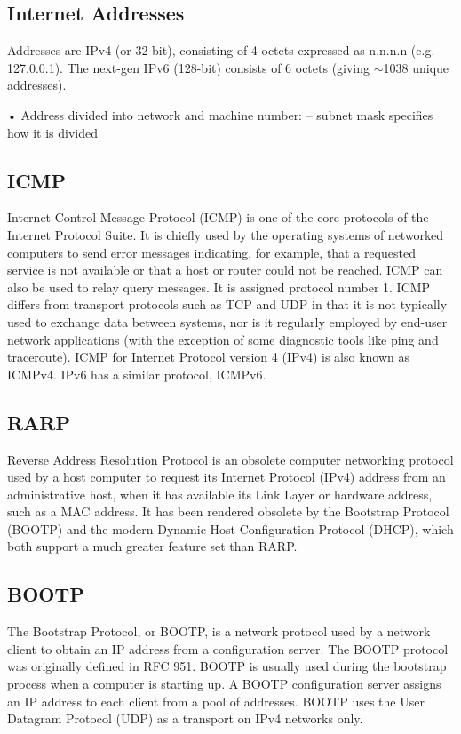 \documentclass[a4paper,oneside]{report}
\begin{document}
    	\subsection{Internet Addresses}
    	Addresses are IPv4 (or 32-bit), consisting of 4 octets expressed as n.n.n.n (e.g. 127.0.0.1). The next-gen IPv6 (128-bit) consists of 6 octets (giving $\sim$1038 unique addresses).

• Address divided into network and machine number:
– subnet mask specifies how it is divided
    	
    	\subsection{ICMP}
	Internet Control Message Protocol (ICMP) is one of the core protocols of the Internet Protocol Suite. It is chiefly used by the operating systems of networked computers to send error messages indicating, for example, that a requested service is not available or that a host or router could not be reached. ICMP can also be used to relay query messages. It is assigned protocol number 1. ICMP differs from transport protocols such as TCP and UDP in that it is not typically used to exchange data between systems, nor is it regularly employed by end-user network applications (with the exception of some diagnostic tools like ping and traceroute).
	ICMP for Internet Protocol version 4 (IPv4) is also known as ICMPv4. IPv6 has a similar protocol, ICMPv6.

    	\subsection{RARP}
	Reverse Address Resolution Protocol is an obsolete computer networking protocol used by a host computer to request its       	Internet Protocol (IPv4) address from an administrative host, when it has available its Link Layer or hardware address, such as a MAC address.
	 It has been rendered obsolete by the Bootstrap Protocol (BOOTP) and the modern Dynamic Host Configuration Protocol (DHCP), which both support a much greater feature set than RARP.

    	\subsection{BOOTP}

	The Bootstrap Protocol, or BOOTP, is a network protocol used by a network client to obtain an IP address from a configuration server. The BOOTP protocol was originally defined in RFC 951.
	BOOTP is usually used during the bootstrap process when a computer is starting up. A BOOTP configuration server assigns an IP address to each client from a pool of addresses. BOOTP uses the User Datagram Protocol (UDP) as a transport on IPv4 networks only.	
\end{document}
